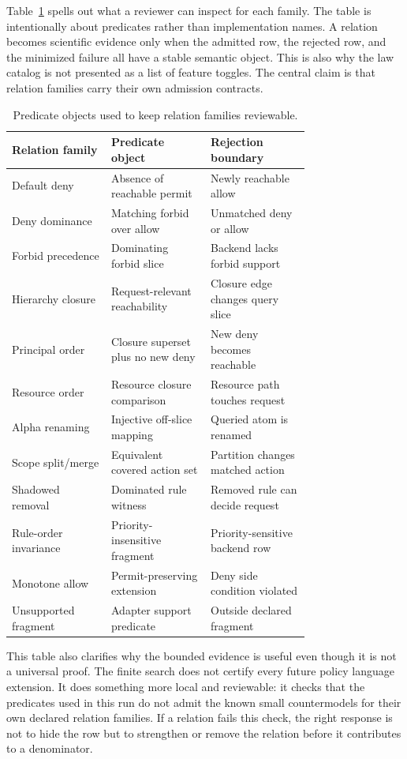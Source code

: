 \documentclass[10pt,conference]{IEEEtran}
\begin{document}
Table~\ref{tab:predicateobjects} spells out what a reviewer can inspect for each family.  The table is intentionally about predicates rather than implementation names.  A relation becomes scientific evidence only when the admitted row, the rejected row, and the minimized failure all have a stable semantic object.  This is also why the law catalog is not presented as a list of feature toggles.  The central claim is that relation families carry their own admission contracts.

\begin{table}[t]
\centering
\caption{Predicate objects used to keep relation families reviewable.}
\label{tab:predicateobjects}
\begin{tabular}{p{0.25\linewidth}p{0.25\linewidth}p{0.25\linewidth}}
\toprule
Relation family & Predicate object & Rejection boundary \\
\midrule
Default deny & Absence of reachable permit & Newly reachable allow \\
Deny dominance & Matching forbid over allow & Unmatched deny or allow \\
Forbid precedence & Dominating forbid slice & Backend lacks forbid support \\
Hierarchy closure & Request-relevant reachability & Closure edge changes query slice \\
Principal order & Closure superset plus no new deny & New deny becomes reachable \\
Resource order & Resource closure comparison & Resource path touches request \\
Alpha renaming & Injective off-slice mapping & Queried atom is renamed \\
Scope split/merge & Equivalent covered action set & Partition changes matched action \\
Shadowed removal & Dominated rule witness & Removed rule can decide request \\
Rule-order invariance & Priority-insensitive fragment & Priority-sensitive backend row \\
Monotone allow & Permit-preserving extension & Deny side condition violated \\
Unsupported fragment & Adapter support predicate & Outside declared fragment \\
\bottomrule
\end{tabular}
\end{table}

This table also clarifies why the bounded evidence is useful even though it is not a universal proof.  The finite search does not certify every future policy language extension.  It does something more local and reviewable: it checks that the predicates used in this run do not admit the known small countermodels for their own declared relation families.  If a relation fails this check, the right response is not to hide the row but to strengthen or remove the relation before it contributes to a denominator.
\end{document}
